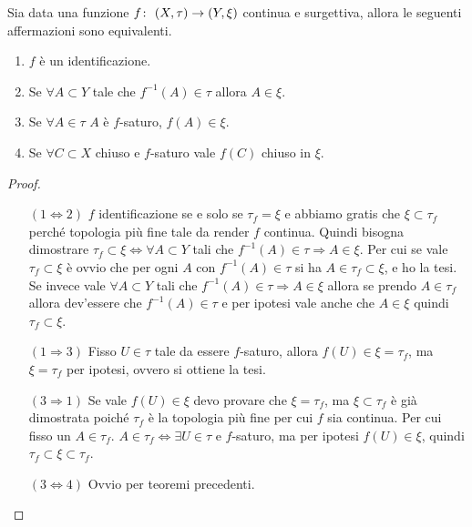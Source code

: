 \begin{theorem}
	\label{crtident}
	Sia data una funzione $f \colon\ (X,\tau) \rightarrow (Y, \xi)$ continua e surgettiva, allora le seguenti affermazioni sono equivalenti.
	\begin{enumerate}
		\item $f$ è un identificazione.
		\item Se $\forall A \subset Y$  tale che $f^{-1}(A) \in \tau$ allora $A \in \xi$.
		\item Se $\forall A \in \tau$ $A$ è $f$-saturo, $f(A) \in \xi$.
		\item Se $\forall C \subset X$ chiuso e $f$-saturo vale $f(C)$ chiuso in $\xi$.
	\end{enumerate}
\end{theorem}
\begin{proof}\
	\begin{enumerate}
		\item[$(1 \Leftrightarrow 2)$] $f$ identificazione se e solo se $\tau_f = \xi$ e abbiamo gratis che $\xi \subset \tau_f$ perché topologia più fine tale da render $f$ continua. Quindi bisogna dimostrare $\tau_f \subset \xi \Longleftrightarrow \forall A \subset Y$ tali che $f^{-1}(A) \in \tau \Rightarrow A \in \xi$. Per cui se vale $\tau_f \subset \xi$ è ovvio che per ogni $A$ con $f^{-1}(A) \in \tau$ si ha $A \in \tau_f \subset \xi$, e ho la tesi. Se invece vale $\forall A \subset Y$ tali che $f^{-1}(A) \in \tau \Rightarrow A \in \xi$ allora se prendo $A \in \tau_f$ allora dev'essere che $f^{-1}(A) \in \tau$ e per ipotesi vale anche che $A \in \xi$ quindi $\tau_f \subset \xi$. 
		\item[$(1 \Rightarrow 3)$] Fisso $U \in \tau$ tale da essere $f$-saturo, allora $f(U) \in \xi = \tau_f$, ma $\xi = \tau_f$ per ipotesi, ovvero si ottiene la tesi.
		\item[$(3 \Rightarrow 1)$] Se vale $f(U) \in \xi$ devo provare che $\xi = \tau_f$, ma $\xi \subset \tau_f$ è già dimostrata poiché $\tau_f$ è la topologia più fine per cui $f$ sia continua. Per cui fisso un $A \in \tau_f$. $A \in \tau_f \Leftrightarrow \exists U \in \tau$ e $f$-saturo, ma per ipotesi $f(U) \in \xi$, quindi $\tau_f \subset \xi \subset \tau_f$.
		\item[$(3\Leftrightarrow 4)$] Ovvio per teoremi precedenti.
	\end{enumerate}
\end{proof}


